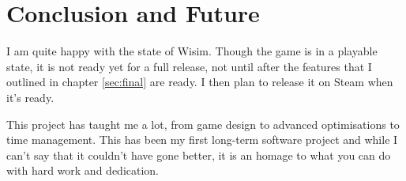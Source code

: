 \section{Conclusion and Future}

I am quite happy with the state of Wisim. Though the game is in a playable
state, it is not ready yet for a full release, not until after the features that I outlined
in chapter \ref{sec:final} are ready.
I then plan to release it on Steam when it's ready.

This project has taught me a lot, from game design to advanced optimisations to time management. This has been my first
long-term software project and while I can't say that it couldn't have gone better, it is an homage to what you can do with
hard work and dedication.
